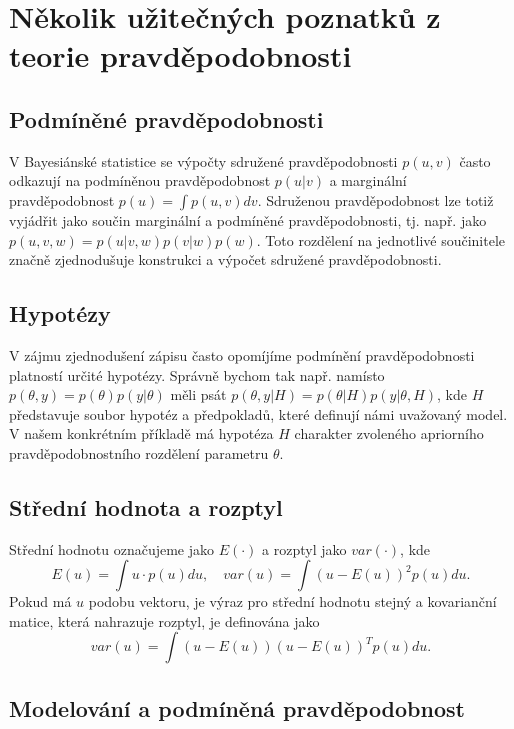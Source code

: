 \section{Několik užitečných poznatků z teorie pravděpodobnosti}

\subsection{Podmíněné pravděpodobnosti}

V Bayesiánské statistice se výpočty sdružené pravděpodobnosti $p(u, v)$ často odkazují na podmíněnou pravděpodobnost $p(u|v)$ a marginální pravděpodobnost $p(u) = \int p(u, v) dv$. Sdruženou pravděpodobnost lze totiž vyjádřit jako součin marginální a podmíněné pravděpodobnosti, tj. např. jako $p(u, v, w) = p(u | v, w) p(v | w) p(w)$. Toto rozdělení na jednotlivé součinitele značně zjednodušuje konstrukci a výpočet sdružené pravděpodobnosti.

\subsection{Hypotézy}

V zájmu zjednodušení zápisu často opomíjíme podmínění pravděpodobnosti platností určité hypotézy. Správně bychom tak např. namísto $p(\theta, y) = p(\theta) p(y | \theta)$ měli psát $p(\theta, y | H) = p(\theta | H) p(y | \theta, H)$, kde $H$ představuje soubor hypotéz a předpokladů, které definují námi uvažovaný model. V našem konkrétním příkladě má hypotéza $H$ charakter zvoleného apriorního pravděpodobnostního rozdělení parametru $\theta$.

\subsection{Střední hodnota a rozptyl}

Střední hodnotu označujeme jako $E(\cdot)$ a rozptyl jako $var(\cdot)$, kde
\begin{equation}
E(u) = \int u \cdot p(u) du, \quad var(u) = \int (u - E(u))^2 p(u) du.
\end{equation}
Pokud má $u$ podobu vektoru, je výraz pro střední hodnotu stejný a kovarianční matice, která nahrazuje rozptyl, je definována jako
\begin{equation}
var(u) = \int (u - E(u))(u - E(u))^T p(u) du.
\end{equation}

\subsection{Modelování a podmíněná pravděpodobnost}

